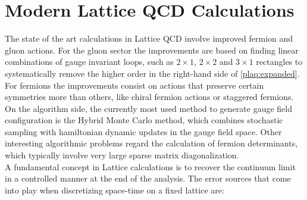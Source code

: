 \section{Modern Lattice QCD Calculations}
The state of the art calculations in Lattice QCD involve improved fermion and gluon actions. For the gluon sector the improvements are based on finding linear combinations of gauge invariant loops, such as $2\times 1$, $2\times 2$ and $3\times 1$ rectangles to systematically remove the higher order in the right-hand side of \cref{plaq:expanded}. For fermions the improvements consist on actions that preserve certain symmetries more than others, like chiral fermion actions or staggered fermions.\\
On the algorithm side, the currently most used method to generate gauge field configuration is the Hybrid Monte Carlo method, which combines stochastic sampling with hamiltonian dynamic updates in the  gauge field space. Other interesting algorithmic problems regard the calculation of fermion determinants, which typically involve very large sparse matrix diagonalization.\\
A fundamental concept in Lattice calculations is to recover the continuum limit in a controlled manner at the end of the analysis. The error sources that come into play when discretizing space-time on a fixed lattice are:
